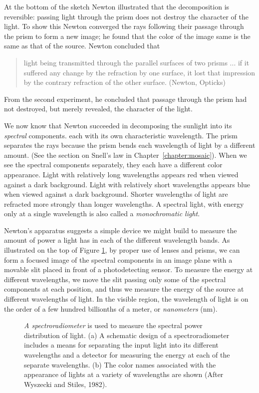 At the bottom of the sketch
Newton illustrated that the decomposition is reversible:
passing light through the prism does not destroy the
character of the light.
To show this Newton converged the rays
following their passage through the prism to form a new image;
he found that the color of the image same is the same as that of the source.
Newton concluded that
\begin{quote}
light being transmitted through the parallel surfaces of two prisms ...
if it suffered any change by the refraction by one surface, it lost
that impression by the contrary refraction of the other surface.
(Newton, Opticks)
\end{quote}
From the second experiment, he concluded that passage through
the prism had not destroyed, but merely revealed, the character of the light.

We now know that Newton succeeded in
decomposing the sunlight into its {\em spectral} components.
each with its own characteristic wavelength.
The prism separates the rays because the prism bends
each wavelength of light by a different amount.
(See the section on Snell's law in Chapter~\ref{chapter:mosaic}).
When we see the spectral components separately, they each
have a different color appearance.
Light with relatively long wavelengths
appears red when viewed against a dark background.
Light with relatively short wavelengths
appears blue when viewed against a dark background.
Shorter wavelengths of light are
refracted more strongly than longer wavelengths.
A spectral light, with energy only at a single wavelength
is also called a {\em monochromatic light}.

Newton's apparatus suggests a simple device we might
build to measure the amount of power a light
has in each of the different wavelength bands.
As illustrated on the top of Figure \ref{f3:spectroradiometer},
by proper use of lenses and prisms,
we can form a focused image of the
spectral components in an image plane with a movable slit
placed in front of a photodetecting sensor.
To measure the energy at different wavelengths,
we move the slit passing only
some of the spectral components at each position,
and thus we measure the energy of the source at
different wavelengths of light.
In the visible region,
the wavelength of light is on the order of a few
hundred billionths of a meter, or {\em nanometers} (nm).
\begin{figure}
\centerline {
}
\caption[Spectro-radiometer]{
{\em A spectroradiometer}
is used to measure the spectral power distribution of light.
(a) A schematic design of a spectroradiometer
includes a means for separating the input light into
its different wavelengths and a detector for measuring
the energy at each of the separate wavelengths.
(b) The color names associated with the
appearance of lights at
a variety of wavelengths are shown (After Wyszecki and Stiles, 1982).
}
\label{f3:spectroradiometer}
\end{figure}

